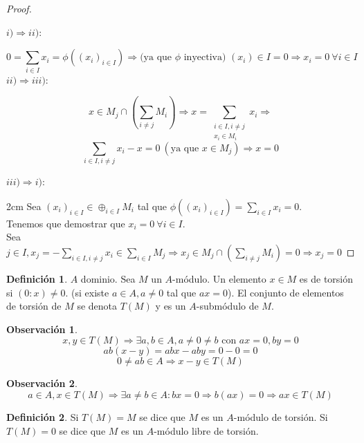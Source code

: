 \documentclass{article}
\theoremstyle{theorem-style}  %
\theoremstyle{definition}
\newtheorem{definition}{Definición}[section]
\newtheorem*{observation}{Observación} %
\theoremstyle{example-style}
\begin{document}
	\begin{proof}
		\ 

		$i) \Rightarrow ii)$:

		 \[ 0=\sum_{i\in I} x_i=\phi ((x_i)_{i\in I}) \Rightarrow \text{(ya que $\phi$ inyectiva) } (x_i) \in I =0 \Rightarrow x_i =0 \ \forall i \in I \]
		$ii) \Rightarrow iii)$:

		\[ x \in M_j \cap (\sum_{i\neq j}M_i) \Rightarrow x=\sum_{\substack{i\in I, i\neq j \\ x_i\in M_i}} x_i \Rightarrow\]
		 \[ \sum_{i\in I, i\neq j} x_i -x = 0 \  (\text{ya que }x\in M_j) \Rightarrow  x=0  \]

		$iii) \Rightarrow i)$:

		 2cm \dimexpr\linewidth-2cm\relax
		Sea $ (x_i)_{i\in I} \in \oplus_{i\in I} M_i  $ tal que $ \phi ((x_i)_{i\in I})=\sum_{i\in I} x_i=0 $. \\
		Tenemos que demostrar que $ x_i=0 \ \forall i \in I $. \\
		Sea $ j\in I, x_j = -\sum_{i\in I, i\neq j}x_i \in \sum_{i\in I} M_j \Rightarrow x_j \in M_j \cap (\sum_{i\neq j} M_i)=0 \Rightarrow x_j=0 $
	\end{proof}

	\begin{definition}
		$ A $ dominio. Sea $ M$ un $ A $-módulo. Un elemento $ x\in M $ es de torsión si $ (0:x)\neq 0 $.
		(si existe $ a\in A, a \neq 0 $ tal que $ ax=0 $).
		El conjunto de elementos de torsión de $ M $ se denota $ T(M) $ y es un $ A $-submódulo de $ M $.
	\end{definition}

	\begin{observation}
		\[x,y\in T(M) \Rightarrow \exists a,b \in A, a\neq 0\neq b \text{ con } ax=0, by=0\]
		\[ ab(x-y)=abx-aby=0-0=0\]
		\[0\neq ab \in A \Rightarrow x-y \in T(M)\]
	\end{observation}

	\begin{observation}
	\[ a \in A, x \in T(M) \Rightarrow \exists a\neq b \in A : bx=0 \Rightarrow b(ax)=0 \Rightarrow ax \in T(M) \]
	\end{observation}

	\begin{definition}
		Si $ T(M)=M $ se dice que $ M $ es un $ A $-módulo de torsión. Si $ T(M)=0 $ se dice que $ M $ es un $ A $-módulo libre de torsión.
	\end{definition}
\end{document}
